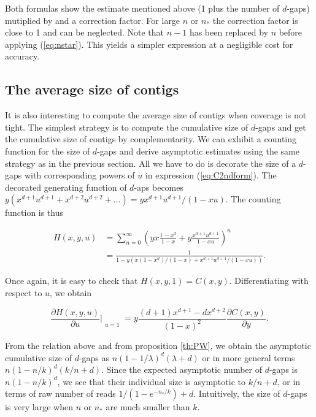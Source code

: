 \documentclass{article}
\begin{document}
Both formulas show the estimate mentioned above (1 plus the number of
$d$-gaps) mutiplied by and a correction factor. For large $n$ or $n_*$ the
correction factor is close to 1 and can be neglected.  Note that $n-1$ has
been replaced by $n$ before applying (\ref{eq:nstar}). This yields a
simpler expression at a negligible cost for accuracy.

\subsection{The average size of contigs}

It is also interesting to compute the average size of contigs when
coverage is not tight. The simplest strategy is to compute the cumulative
size of $d$-gaps and get the cumulative size of contigs by
complementarity. We can exhibit a counting function for the size of
$d$-gaps and derive asymptotic estimates using the same strategy as in the
previous section. All we have to do is decorate the size of a $d$-gaps
with corresponding powers of $u$ in expression (\ref{eq:C2ndform}). The
decorated generating function of $d$-aps becomes $y(x^{d+1}u^{d+1} +
x^{d+2}u^{d+2} + \ldots ) = yx^{d+1}u^{d+1}/(1-xu)$. The counting function
is thus

\begin{equation*}
\begin{split}
H(x,y,u) &= \sum_{n=0}^\infty \left(yx\frac{1-x^d}{1-x} +
y\frac{x^{d+1}u^{d+1}}{1-xu}\right)^n \\
&= \frac{1}{1-y \left(x(1-x^d)/(1-x) +
x^{d+1}u^{d+1}/(1-xu) \right)}.
\end{split}
\end{equation*}

Once again, it is easy to check that $H(x,y,1) = C(x,y)$. Differentiating
with respect to $u$, we obtain

\begin{equation*}
\frac{\partial H(x,y,u)}{\partial u}\Bigr|_{\substack{\\u=1}}
= y \frac{(d+1)x^{d+1}-dx^{d+2}}{(1-x)^2} \frac{\partial C(x,y)}
{\partial y}.
\end{equation*}

From the relation above and from proposition \ref{th:PW}, we obtain the
asymptotic cumulative size of $d$-gaps as $n(1-1/\lambda)^d(\lambda+d)$ or
in more general terms $n(1-n/k)^d(k/n+d)$.  Since the expected asymptotic
number of $d$-gaps is $n(1-n/k)^d$, we see that their individual size is
asymptotic to $k/n+d$, or in terms of raw number of reads
$1/(1-e^{-n_*/k}) + d$. Intuitively, the size of $d$-gaps is very large
when $n$ or $n_*$ are much smaller than $k$.
\end{document}
